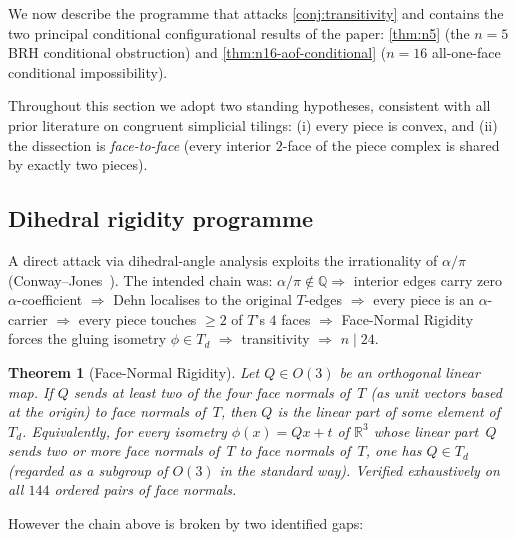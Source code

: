 \documentclass[11pt,a4paper]{article}
\theoremstyle{plain}
\newtheorem{theorem}{Theorem}[section]
\theoremstyle{definition}
\theoremstyle{remark}
\newcommand{\Td}{T_{\!d}}
\newcommand{\Q}{\mathbb{Q}}
\newcommand{\R}{\mathbb{R}}
\begin{document}
We now describe the programme that attacks \cref{conj:transitivity} and
contains the two principal conditional configurational results of the paper:
\cref{thm:n5} (the $n = 5$ BRH conditional obstruction) and
\cref{thm:n16-aof-conditional} ($n = 16$ all-one-face conditional
impossibility).

Throughout this section we adopt two standing hypotheses, consistent with
all prior literature on congruent simplicial tilings: (i) every piece is
convex, and (ii) the dissection is \emph{face-to-face} (every interior
$2$-face of the piece complex is shared by exactly two pieces).

\subsection{Dihedral rigidity programme}\label{ssec:rigidity}

A direct attack via dihedral-angle analysis exploits the irrationality of
$\alpha/\pi$ (Conway--Jones~\cite{ConwayJones1976}).  The intended chain was:
$\alpha/\pi \notin \Q \Rightarrow$ interior edges carry zero
$\alpha$-coefficient $\Rightarrow$ Dehn localises to the original $T$-edges
$\Rightarrow$ every piece is an $\alpha$-carrier $\Rightarrow$ every piece
touches $\geq 2$ of $T$'s $4$ faces $\Rightarrow$ Face-Normal Rigidity forces
the gluing isometry $\phi \in \Td$ $\Rightarrow$ transitivity
$\Rightarrow$ $n \mid 24$.

\begin{theorem}[Face-Normal Rigidity]\label{thm:fnr}
Let $Q \in O(3)$ be an orthogonal linear map.  If $Q$ sends at least two
of the four face normals of~$T$ (as unit vectors based at the origin) to
face normals of~$T$, then $Q$ is the linear part of some element
of~$\Td$.  Equivalently, for every isometry
$\phi(x) = Qx + t$ of $\R^{3}$ whose linear part~$Q$ sends two or more
face normals of~$T$ to face normals of~$T$, one has $Q \in \Td$ (regarded
as a subgroup of $O(3)$ in the standard way).  Verified exhaustively on
all $144$ ordered pairs of face normals.
\end{theorem}

However the chain above is broken by two identified gaps:
\end{document}
